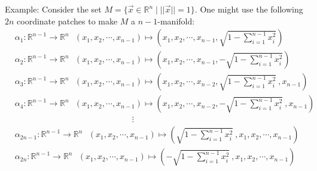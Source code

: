 \documentclass[11pt,oneside]{book}
\theoremstyle{break}
\theoremstyle{break}
\newcommand{\R}{\mathbb{R}}
\newcommand{\example}{\color{green}Example: \color{black}}
\begin{document}
\example Consider the set $M=\{ \vec{x}\in \R^n \mid ||\vec{x}||=1\}$. One might use the following $2n$ coordinate patches to make $M$ a $n-1$-manifold:
\begin{align*}
&\alpha_1: \R^{n-1} \to \R^n \ \ \ (x_1,x_2,\cdots, x_{n-1})\mapsto \left(x_1,x_2,\cdots, x_{n-1}, \sqrt{1-\sum_{i=1}^{n-1} x_i^2}\right)\\
&\alpha_2: \R^{n-1} \to \R^n \ \ \ (x_1,x_2,\cdots, x_{n-1})\mapsto \left(x_1,x_2,\cdots, x_{n-1}, -\sqrt{1-\sum_{i=1}^{n-1} x_i^2}\right)\\
&\alpha_3: \R^{n-1} \to \R^n \ \ \ (x_1,x_2,\cdots, x_{n-1})\mapsto \left(x_1,x_2,\cdots, x_{n-2}, \sqrt{1-\sum_{i=1}^{n-1} x_i^2}\ , x_{n-1}\right)\\
&\alpha_4: \R^{n-1} \to \R^n \ \ \ (x_1,x_2,\cdots, x_{n-1})\mapsto \left(x_1,x_2,\cdots,x_{n-2}, -\sqrt{1-\sum_{i=1}^{n-1} x_i^2}\ ,x_{n-1}\right)\\
&{}\qquad\qquad\qquad\qquad\qquad\qquad\qquad\vdots\\
&\alpha_{2n-1}: \R^{n-1} \to \R^n \ \ \ (x_1,x_2,\cdots, x_{n-1})\mapsto \left(\sqrt{1-\sum_{i=1}^{n-1} x_i^2}\ ,x_1,x_2,\cdots, x_{n-1}\right)\\
&\alpha_{2n}: \R^{n-1} \to \R^n \ \ \ (x_1,x_2,\cdots, x_{n-1})\mapsto \left(-\sqrt{1-\sum_{i=1}^{n-1} x_i^2}\ ,x_1,x_2,\cdots, x_{n-1}\right)\\
\end{align*}
\newpage
\end{document}
